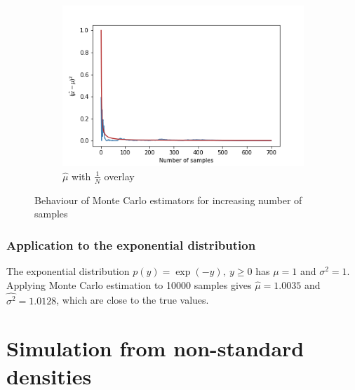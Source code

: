 \documentclass[a4paper]{article}
\begin{document}
\begin{figure}[h]
\begin{subfigure}[b]{0.3\textwidth}
        \includegraphics[width=\textwidth]{figures/monte_carlo_mean_best_fit.png}
        \caption{$\hat{\mu}$ with $\frac{1}{N}$ overlay}
        \label{fig:monte_carlo_mean_best_fit}
    \end{subfigure}
    \caption{Behaviour of Monte Carlo estimators for increasing number of samples}
    \label{fig:monte_carlo_convergence}
\end{figure}

\subsubsection{Application to the exponential distribution}
The exponential distribution $p(y) = \exp(-y), \ y \geq 0$ has $\mu = 1$ and $\sigma^2 = 1$.
Applying Monte Carlo estimation to 10000 samples gives $\hat{\mu} = 1.0035$ and $\hat{\sigma^2} = 1.0128$, which are
close to the true values.



\section{Simulation from non-standard densities}
\end{document}
